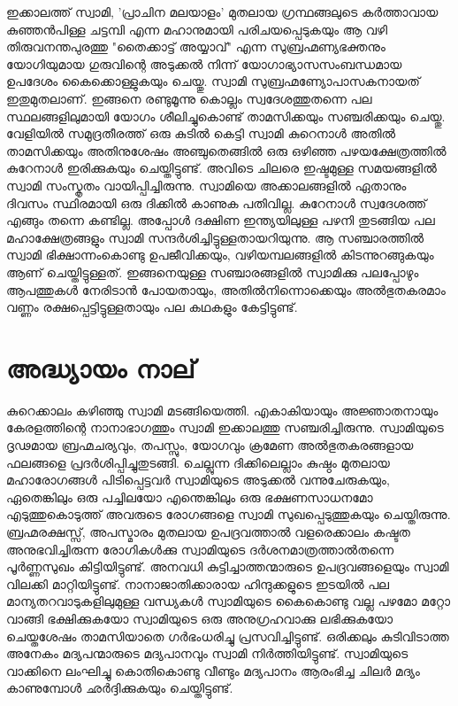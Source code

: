 \documentclass[12pt,openany]{book}
\begin{document}
	ഇക്കാലത്ത് സ്വാമി, 'പ്രാചിന മലയാളം' മുതലായ ഗ്രന്ഥങ്ങലുടെ കർത്താവായ കുഞ്ഞൻപിള്ള ചട്ടമ്പി എന്ന മഹാനുമായി പരിചയപ്പെടുകയും ആ വഴി തിരുവനന്തപുരത്തു "തൈക്കാട്ട് അയ്യാവ്" എന്ന സുബ്രഹ്മണ്യഭക്തനും യോഗിയുമായ ഗുരുവിന്റെ അടുക്കൽ നിന്ന് യോഗാഭ്യാസസംബന്ധമായ ഉപദേശം കൈക്കൊള്ളുകയും ചെയ്തു. സ്വാമി സുബ്രഹ്മണ്യോപാസകനായത് ഇതുമുതലാണ്. ഇങ്ങനെ രണ്ടുമൂന്നു കൊല്ലം സ്വദേശത്തുതന്നെ പല സ്ഥലങ്ങളിലുമായി യോഗം ശീലിച്ചുകൊണ്ട് താമസിക്കയും സഞ്ചരിക്കയും ചെയ്തു. വേളിയിൽ സമുദ്രതീരത്ത് ഒരു കുടിൽ കെട്ടി സ്വാമി കുറെനാൾ അതിൽ താമസിക്കയും അതിനുശേഷം അഞ്ചുതെങ്ങിൽ ഒരു ഒഴിഞ്ഞ പഴയക്ഷേത്രത്തിൽ കുറേനാൾ ഇരിക്കുകയും ചെയ്തിട്ടുണ്ട്. അവിടെ ചിലരെ ഇഷ്ടമുള്ള സമയങ്ങളിൽ സ്വാമി സംസ്കൃതം വായിപ്പിച്ചിരുന്നു. സ്വാമിയെ അക്കാലങ്ങളിൽ ഏതാനും ദിവസം സ്ഥിരമായി ഒരു ദിക്കിൽ കാണുക പതിവില്ല. കുറേനാൾ സ്വദേശത്ത് എങ്ങും തന്നെ കണ്ടില്ല. അപ്പോൾ ദക്ഷിണ ഇന്ത്യയിലുള്ള പഴനി തുടങ്ങിയ പല മഹാക്ഷേത്രങ്ങളും സ്വാമി സന്ദർശിച്ചിട്ടുള്ളതായറിയുന്നു. ആ സഞ്ചാരത്തിൽ സ്വാമി ഭിക്ഷാന്നംകൊണ്ടു ഉപജീവിക്കയും, വഴിയമ്പലങ്ങളിൽ കിടന്നുറങ്ങുകയും ആണ് ചെയ്തിട്ടുള്ളത്. ഇങ്ങനെയുള്ള സഞ്ചാരങ്ങളിൽ സ്വാമിക്കു പലപ്പോഴും ആപത്തുകൾ നേരിടാൻ പോയതായും, അതിൽനിന്നൊക്കെയും അൽഭുതകരമാം വണ്ണം രക്ഷപ്പെട്ടിട്ടുള്ളതായും പല കഥകളും കേട്ടിട്ടുണ്ട്.
	
	\newpage
	
	\chapter*{അദ്ധ്യായം നാല്}
	
	കുറെക്കാലം കഴിഞ്ഞു സ്വാമി മടങ്ങിയെത്തി. എകാകിയായും അജ്ഞാതനായും കേരളത്തിന്റെ നാനാഭാഗത്തും സ്വാമി ഇക്കാലത്തു സഞ്ചരിച്ചിരുന്നു. സ്വാമിയുടെ ദൃഢമായ ബ്രഹ്മചര്യവും, തപസ്സും, യോഗവും ക്രമേണ അൽഭുതകരങ്ങളായ ഫലങ്ങളെ പ്രദർശിപ്പിച്ചുതുടങ്ങി. ചെല്ലുന്ന ദിക്കിലെല്ലാം കുഷ്ഠം മുതലായ മഹാരോഗങ്ങൾ പിടിപ്പെട്ടവർ സ്വാമിയുടെ അടുക്കൽ വന്നുചേരുകയും, ഏതെങ്കിലും ഒരു പച്ചിലയോ എന്തെങ്കിലും ഒരു ഭക്ഷണസാധനമോ എടുത്തുകൊടുത്ത് അവരുടെ രോഗങ്ങളെ സ്വാമി സുഖപ്പെടുത്തുകയും ചെയ്തിരുന്നു. ബ്രഹ്മരക്ഷസ്സ്, അപസ്മാരം മുതലായ ഉപദ്രവത്താൽ വളരെക്കാലം കഷ്ടത അനുഭവിച്ചിരുന്ന രോഗികൾക്കു സ്വാമിയുടെ ദർശനമാത്രത്താൽതന്നെ പൂർണ്ണസുഖം കിട്ടിയിട്ടുണ്ട്. അനവധി കുട്ടിച്ചാത്തന്മാരുടെ ഉപദ്രവങ്ങളെയും സ്വാമി വിലക്കി മാറ്റിയിട്ടുണ്ട്. നാനാജാതിക്കാരായ ഹിന്ദുക്കളുടെ ഇടയിൽ പല മാന്യതറവാടുകളിലുമുള്ള വന്ധ്യകൾ സ്വാമിയുടെ കൈകൊണ്ടു വല്ല പഴമോ മറ്റോ വാങ്ങി ഭക്ഷിക്കുകയോ സ്വാമിയുടെ ഒരു അനുഗ്രഹവാക്കു ലഭിക്കുകയോ ചെയ്തശേഷം താമസിയാതെ ഗർഭംധരിച്ചു പ്രസവിച്ചിട്ടുണ്ട്. ഒരിക്കലും കുടിവിടാത്ത അനേകം മദ്യപന്മാരുടെ മദ്യപാനവും സ്വാമി നിർത്തിയിട്ടുണ്ട്. സ്വാമിയുടെ വാക്കിനെ ലംഘിച്ചു കൊതികൊണ്ടു വീണ്ടും മദ്യപാനം ആരംഭിച്ച ചിലർ മദ്യം കാണുമ്പോൾ ഛർദ്ദിക്കുകയും ചെയ്തിട്ടുണ്ട്.
	
\end{document}
